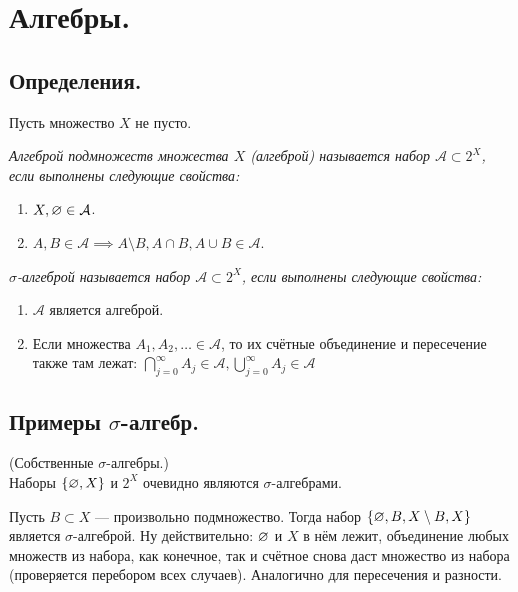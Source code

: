 
\section{Алгебры.}

\subsection{Определения.}
Пусть множество $X$ не пусто.
\begin{definition}
    \it{Алгеброй подмножеств множества $X$} (алгеброй) называется набор $\mathcal{A} \subset 2^X$, если выполнены следующие свойства:
    \begin{enumerate}
        \item $X, \varnothing \in \mathcal{A}$.
        \item $A, B \in \mathcal{A} \implies A \setminus B, A \cap B, A \cup B \in \mathcal{A}$.
    \end{enumerate}
\end{definition}
\begin{definition}
    \it{$\sigma$-алгеброй} называется набор $\mathcal{A} \subset 2^X$, если выполнены следующие свойства:
    \begin{enumerate}
        \item $\mathcal{A}$ является алгеброй.
        \item Если множества $A_1, A_2, \ldots \in \mathcal{A}$, то их счётные объединение и пересечение также
        там лежат: $\bigcap_{j = 0}^{\infty} A_j \in \mathcal{A}, \bigcup_{j = 0}^{\infty} A_j \in \mathcal{A}$
    \end{enumerate}
\end{definition}

\subsection{Примеры $\sigma$-алгебр.}
\begin{example}{(Собственные $\sigma$-алгебры.)\\}
    Наборы $\{\varnothing, X\}$ и $2^X$ очевидно являются $\sigma$-алгебрами.
\end{example}

\begin{example}
    Пусть $B \subset X$ --- произвольно подмножество. Тогда набор $\{\varnothing, B, X \setminus B, X\}$ является
    $\sigma$-алгеброй. Ну действительно: $\varnothing$ и $X$ в нём лежит, объединение любых множеств из набора, как
    конечное, так и счётное снова даст множество из набора (проверяется перебором всех случаев). Аналогично для
    пересечения и разности.
\end{example}

